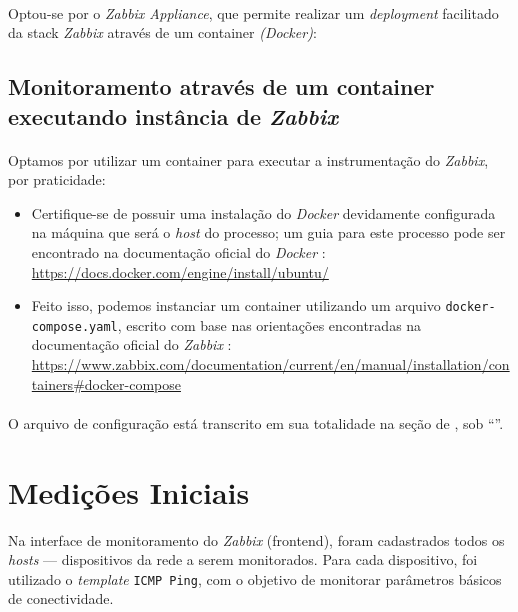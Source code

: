 \documentclass[12pt]{article}
\begin{document}
\paragraph{}
Optou-se por o \textit{Zabbix Appliance}, que permite realizar um \textit{deployment} facilitado
da stack \textit{Zabbix} através de um container \textit{(Docker)}:

\subsection{Monitoramento através de um container executando instância de \textit{Zabbix}}
\paragraph{}
Optamos por utilizar um container para executar a instrumentação do \textit{Zabbix}, por praticidade:

\begin{itemize}
  \item Certifique-se de possuir uma instalação do \textit{Docker} devidamente configurada na máquina que será o
    \textit{host} do processo; um guia para este processo pode ser encontrado na documentação oficial do
    \textit{Docker} \cite{docker2025docs}: \\
    \url{https://docs.docker.com/engine/install/ubuntu/}
  \item Feito isso, podemos instanciar um container utilizando um arquivo \texttt{docker-compose.yaml}, escrito com base
    nas orientações encontradas na documentação oficial do \textit{Zabbix} \cite{zabbix2025manual}: \\
    \url{https://www.zabbix.com/documentation/current/en/manual/installation/containers#docker-compose}
\end{itemize}

\paragraph{}
O arquivo de configuração está transcrito em sua totalidade na seção de , sob ``''.

\section{Medições Iniciais}

Na interface de monitoramento do \textit{Zabbix} (frontend), foram cadastrados todos os \textit{hosts} — dispositivos da rede a serem monitorados. Para cada dispositivo, foi utilizado o \textit{template} \texttt{ICMP Ping}, com o objetivo de monitorar parâmetros básicos de conectividade.
\end{document}
